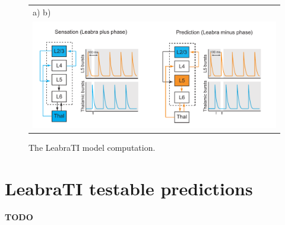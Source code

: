 \documentclass[dwyatte_dissertation.tex]{subfiles}
\begin{document}
\begin{figure}[h!]
\begin{center}
\begin{tabular}{ll}
a) \hspace{76mm} b) \\
\multicolumn{2}{c}{\includegraphics[width=160mm]{figs/chap_leabrati/leabrati_comp.pdf}} \\
\end{tabular}
\end{center}
\caption{The LeabraTI model computation.}
\label{fig:leabrati_comp}
\end{figure}

\section{LeabraTI testable predictions}
\textbf{TODO}
\end{document}
